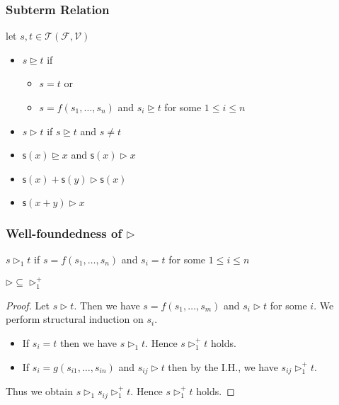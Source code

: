 \documentclass[12pt,aspectratio=169]{beamer}
\newcommand{\m}[1]{\mathsf{#1}}
\newcommand{\FF}{\mathcal{F}}
\newcommand{\VV}{\mathcal{V}}
\newcommand{\TT}{\mathcal{T}}
\begin{document}
\begin{frame}
    \frametitle{Subterm Relation}
    \begin{definition}
        let $s,t \in \TT(\FF,\VV)$
        \begin{itemize}
            \item $s \unrhd t$ if
                \begin{itemize}
                    \item $s = t$ or
                    \item $s = f(s_1,\dots,s_n)$ and $s_i \unrhd t$ for some $1 \leq i \leq n$
                \end{itemize}
            \item $s \rhd t$ if $s \unrhd t$ and $s \neq t$
        \end{itemize}
    \end{definition}
    \pause
    \begin{example}
        \begin{itemize}
            \pause
            \item $\m{s}(x) \unrhd x$ and $\m{s}(x) \rhd x$
            \pause
            \item $\m{s}(x) + \m{s}(y) \rhd \m{s}(x)$
            \pause
            \item $\m{s}(x + y) \rhd x$
        \end{itemize}
    \end{example}
\end{frame}

\begin{frame}
    \frametitle{Well-foundedness of $\rhd$}

    \begin{definition}
        $s \rhd_1 t$ if $s = f(s_1,\dots,s_n)$ and $s_i = t$ for some $1 \leq i \leq n$
    \end{definition}
    \pause
    \begin{lemma}
        $\rhd \subseteq \rhd_1^+$
    \end{lemma}
    \pause
    \begin{proof}
        Let $s \rhd t$. \pause
        Then we have $s = f(s_1,\dots,s_m)$ and $s_i \rhd t$ for some $i$.
        \pause
        We perform structural induction on $s_i$.
        \pause
        \begin{itemize}
            \item If $s_i = t$ then we have $s \rhd_1 t$. Hence $s \rhd_1^+ t$ holds.
            \pause
            \item If $s_i = g(s_{i1}, \dots, s_{in})$ and $s_{ij} \rhd t$ then by the I.H., we have $s_{ij} \rhd_1^+ t$.
        \end{itemize}
        Thus we obtain $s \rhd_1 s_{ij} \rhd_1^+ t$. Hence $s \rhd_1^+ t$ holds.
    \end{proof}
\end{frame}
\end{document}
